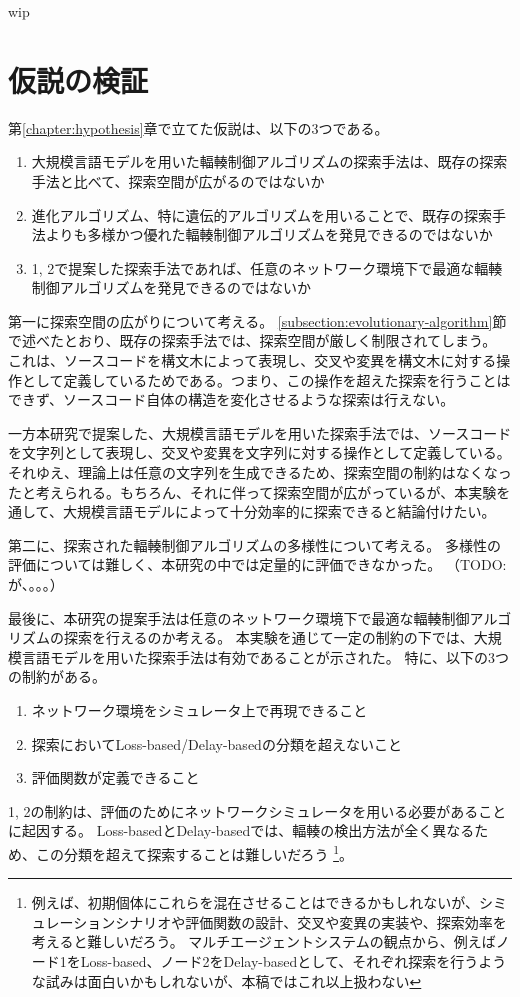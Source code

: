 \documentclass[a4paper,11pt]{jreport}
\newcommand{\chapref}[1]{第\ref{#1}章}
\newcommand{\secref}[1]{\ref{#1}節}
\begin{document}
wip

\section{仮説の検証}

\chapref{chapter:hypothesis}で立てた仮説は、以下の3つである。
\begin{enumerate}
  \item 大規模言語モデルを用いた輻輳制御アルゴリズムの探索手法は、既存の探索手法と比べて、探索空間が広がるのではないか
  \item 進化アルゴリズム、特に遺伝的アルゴリズムを用いることで、既存の探索手法よりも多様かつ優れた輻輳制御アルゴリズムを発見できるのではないか
  \item 1, 2で提案した探索手法であれば、任意のネットワーク環境下で最適な輻輳制御アルゴリズムを発見できるのではないか
\end{enumerate}
第一に探索空間の広がりについて考える。
\secref{subsection:evolutionary-algorithm}で述べたとおり、既存の探索手法では、探索空間が厳しく制限されてしまう。
これは、ソースコードを構文木によって表現し、交叉や変異を構文木に対する操作として定義しているためである。つまり、この操作を超えた探索を行うことはできず、ソースコード自体の構造を変化させるような探索は行えない。

一方本研究で提案した、大規模言語モデルを用いた探索手法では、ソースコードを文字列として表現し、交叉や変異を文字列に対する操作として定義している。
それゆえ、理論上は任意の文字列を生成できるため、探索空間の制約はなくなったと考えられる。もちろん、それに伴って探索空間が広がっているが、本実験を通して、大規模言語モデルによって十分効率的に探索できると結論付けたい。

第二に、探索された輻輳制御アルゴリズムの多様性について考える。
多様性の評価については難しく、本研究の中では定量的に評価できなかった。
（TODO: が、。。。）

最後に、本研究の提案手法は任意のネットワーク環境下で最適な輻輳制御アルゴリズムの探索を行えるのか考える。
本実験を通じて一定の制約の下では、大規模言語モデルを用いた探索手法は有効であることが示された。
特に、以下の3つの制約がある。
\begin{enumerate}
  \item ネットワーク環境をシミュレータ上で再現できること
  \item 探索においてLoss-based/Delay-basedの分類を超えないこと
  \item 評価関数が定義できること
\end{enumerate}
1, 2の制約は、評価のためにネットワークシミュレータを用いる必要があることに起因する。
Loss-basedとDelay-basedでは、輻輳の検出方法が全く異なるため、この分類を超えて探索することは難しいだろう
\footnote{例えば、初期個体にこれらを混在させることはできるかもしれないが、シミュレーションシナリオや評価関数の設計、交叉や変異の実装や、探索効率を考えると難しいだろう。
マルチエージェントシステムの観点から、例えばノード1をLoss-based、ノード2をDelay-basedとして、それぞれ探索を行うような試みは面白いかもしれないが、本稿ではこれ以上扱わない}。
\end{document}
